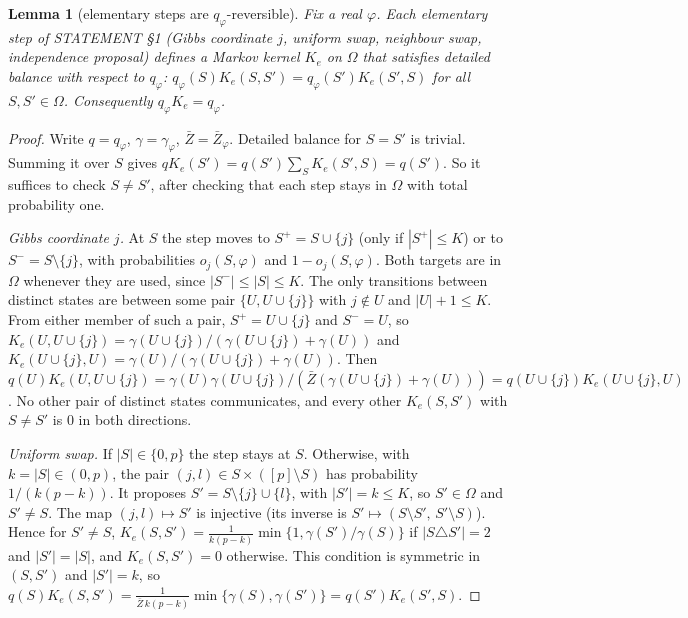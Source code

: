 \documentclass[11pt]{article}
\newtheorem{lemma}{Lemma}[section]
\theoremstyle{remark}
\newcommand{\Zb}{\bar Z}
\newcommand{\Om}{\Omega}
\begin{document}
\begin{lemma}[elementary steps are $q_\varphi$-reversible]\label{lem:rev}
Fix a real $\varphi$. Each elementary step of STATEMENT \S1 (Gibbs coordinate $j$, uniform swap, neighbour swap, independence proposal) defines a Markov kernel $K_e$ on $\Om$ that satisfies detailed balance with respect to $q_\varphi$: $q_\varphi(S)K_e(S,S')=q_\varphi(S')K_e(S',S)$ for all $S,S'\in\Om$. Consequently $q_\varphi K_e=q_\varphi$.
\end{lemma}
\begin{proof}
Write $q=q_\varphi$, $\gamma=\gamma_\varphi$, $\Zb=\Zb_\varphi$. Detailed balance for $S=S'$ is trivial. Summing it over $S$ gives $q K_e(S')=q(S')\sum_SK_e(S',S)=q(S')$. So it suffices to check $S\ne S'$, after checking that each step stays in $\Om$ with total probability one.

\emph{Gibbs coordinate $j$.} At $S$ the step moves to $S^+=S\cup\{j\}$ (only if $|S^+|\le K$) or to $S^-=S\setminus\{j\}$, with probabilities $o_j(S,\varphi)$ and $1-o_j(S,\varphi)$. Both targets are in $\Om$ whenever they are used, since $|S^-|\le |S|\le K$. The only transitions between distinct states are between some pair $\{U,U\cup\{j\}\}$ with $j\notin U$ and $|U|+1\le K$. From either member of such a pair, $S^+=U\cup\{j\}$ and $S^-=U$, so $K_e(U,U\cup\{j\})=\gamma(U\cup\{j\})/(\gamma(U\cup\{j\})+\gamma(U))$ and $K_e(U\cup\{j\},U)=\gamma(U)/(\gamma(U\cup\{j\})+\gamma(U))$. Then
$q(U)K_e(U,U\cup\{j\})=\gamma(U)\gamma(U\cup\{j\})/(\Zb(\gamma(U\cup\{j\})+\gamma(U)))=q(U\cup\{j\})K_e(U\cup\{j\},U)$. No other pair of distinct states communicates, and every other $K_e(S,S')$ with $S\ne S'$ is $0$ in both directions.

\emph{Uniform swap.} If $|S|\in\{0,p\}$ the step stays at $S$. Otherwise, with $k=|S|\in(0,p)$, the pair $(j,l)\in S\times([p]\setminus S)$ has probability $1/(k(p-k))$. It proposes $S'=S\setminus\{j\}\cup\{l\}$, with $|S'|=k\le K$, so $S'\in\Om$ and $S'\neq S$. The map $(j,l)\mapsto S'$ is injective (its inverse is $S'\mapsto(S\setminus S',\,S'\setminus S)$). Hence for $S'\ne S$, $K_e(S,S')=\frac{1}{k(p-k)}\min\{1,\gamma(S')/\gamma(S)\}$ if $|S\triangle S'|=2$ and $|S'|=|S|$, and $K_e(S,S')=0$ otherwise. This condition is symmetric in $(S,S')$ and $|S'|=k$, so
$q(S)K_e(S,S')=\frac{1}{\Zb\,k(p-k)}\min\{\gamma(S),\gamma(S')\}=q(S')K_e(S',S)$.


\end{proof}
\end{document}
